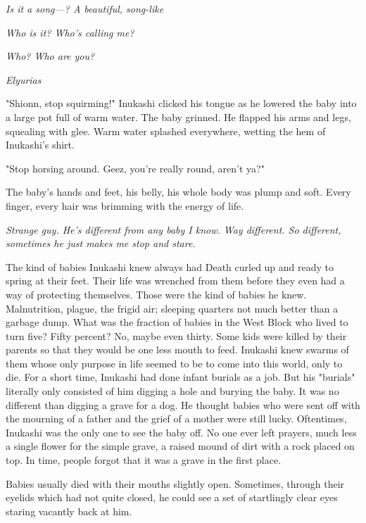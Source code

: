 \emph{Is it a song---? A beautiful, song-like\el }


\emph{Who is it? Who's calling me?}


\emph{Who? Who are you?}


\emph{Elyurias\el }

\mybreak

"Shionn, stop squirming!" Inukashi clicked his tongue as he lowered the
baby into a large pot full of warm water. The baby grinned. He flapped
his arms and legs, squealing with glee. Warm water splashed everywhere,
wetting the hem of Inukashi's shirt.

"Stop horsing around. Geez, you're really round, aren't ya?"

The baby's hands and feet, his belly, his whole body was plump and soft.
Every finger, every hair was brimming with the energy of life.

\emph{Strange guy. He's different from any baby I know. Way different. So
different, sometimes he just makes me stop and stare.}

The kind of babies Inukashi knew always had Death curled up and ready to
spring at their feet. Their life was wrenched from them before they even
had a way of protecting themselves. Those were the kind of babies he
knew. Malnutrition, plague, the frigid air; sleeping quarters not much
better than a garbage dump. What was the fraction of babies in the West
Block who lived to turn five? Fifty percent? No, maybe even thirty. Some
kids were killed by their parents so that they would be one less mouth
to feed. Inukashi knew swarms of them whose only purpose in life seemed
to be to come into this world, only to die. For a short time, Inukashi
had done infant burials as a job. But his "burials" literally only
consisted of him digging a hole and burying the baby. It was no
different than digging a grave for a dog. He thought babies who were
sent off with the mourning of a father and the grief of a mother were
still lucky. Oftentimes, Inukashi was the only one to see the baby off.
No one ever left prayers, much less a single flower for the simple
grave, a raised mound of dirt with a rock placed on top. In time, people
forgot that it was a grave in the first place.

Babies usually died with their mouths slightly open. Sometimes, through
their eyelids which had not quite closed, he could see a set of
startlingly clear eyes staring vacantly back at him.

